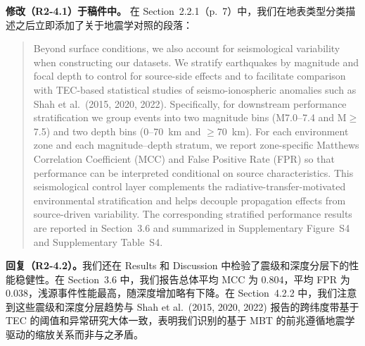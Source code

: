 \documentclass[12pt]{article}
\newcommand{\revresponse}[1]{\begingroup\color{responsecolor}#1\endgroup}
\newcommand{\revchange}[1]{\begingroup\color{changecolor}#1\endgroup}
\begin{document}
\revchange{%
\textbf{修改（R2-4.1）于稿件中。}
在 Section~2.2.1（p.~7）中，我们在地表类型分类描述之后立即添加了关于地震学对照的段落：

\begin{quote}
Beyond surface conditions, we also account for seismological variability when constructing our datasets. We stratify earthquakes by magnitude and focal depth to control for source-side effects and to facilitate comparison with TEC-based statistical studies of seismo-ionospheric anomalies such as Shah et al.~(2015, 2020, 2022). Specifically, for downstream performance stratification we group events into two magnitude bins (M7.0--7.4 and M$\ge$7.5) and two depth bins (0--70~km and $\ge$70~km). For each environment zone and each magnitude--depth stratum, we report zone-specific Matthews Correlation Coefficient (MCC) and False Positive Rate (FPR) so that performance can be interpreted conditional on source characteristics. This seismological control layer complements the radiative-transfer-motivated environmental stratification and helps decouple propagation effects from source-driven variability. The corresponding stratified performance results are reported in Section~3.6 and summarized in Supplementary Figure~S4 and Supplementary Table~S4.
\end{quote}

}

\revresponse{%
\textbf{回复（R2-4.2）。}我们还在 Results 和 Discussion 中检验了震级和深度分层下的性能稳健性。在 Section~3.6 中，我们报告总体平均 MCC 为 0.804，平均 FPR 为 0.038，浅源事件性能最高，随深度增加略有下降。在 Section~4.2.2 中，我们注意到这些震级和深度分层趋势与 Shah et al.~(2015, 2020, 2022) 报告的跨纬度带基于 TEC 的阈值和异常研究大体一致，表明我们识别的基于 MBT 的前兆遵循地震学驱动的缩放关系而非与之矛盾。
}
\end{document}
